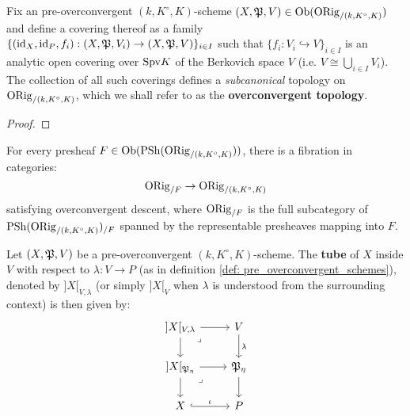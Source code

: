             \begin{proposition} \label{prop: the_overconvergent_topology}
                Fix an pre-overconvergent $(k, K^{\circ}, K)$-scheme $(X, \mathfrak{P}, V) \in \mathrm{Ob}(\mathrm{ORig}_{/(k, K^{\circ}, K)})$ and define a covering thereof as a family $\{(\mathrm{id}_X, \mathrm{id}_P, f_i): (X, \mathfrak{P}, V_i) \to (X, \mathfrak{P}, V)\}_{i \in I}$ such that $\{f_i: V_i \hookrightarrow V\}_{i \in I}$ is an analytic open covering over $\mathrm{Spv} K$ of the Berkovich space $V$ (i.e. $V \cong \bigcup_{i \in I} V_i$). The collection of all such coverings defines a \textit{subcanonical} topology on $\mathrm{ORig}_{/(k, K^{\circ}, K)}$, which we shall refer to as the \textbf{overconvergent topology}.
            \end{proposition}
                \begin{proof}
                    
                \end{proof}
            \begin{corollary}
                For every presheaf $F \in \mathrm{Ob}(\mathrm{PSh}(\mathrm{ORig}_{/(k, K^{\circ}, K)}))$, there is a fibration in categories:
                    $$\mathrm{ORig}_{/F} \to \mathrm{ORig}_{/(k, K^{\circ}, K)}$$
                satisfying overconvergent descent, where $\mathrm{ORig}_{/F}$ is the full subcategory of $\mathrm{PSh}(\mathrm{ORig}_{/(k, K^{\circ}, K)})_{/F}$ spanned by the representable presheaves mapping into $F$.
            \end{corollary}
            \begin{definition}[Tubes] \label{def: berthelot_tubes}
                Let $(X, \mathfrak{P}, V)$ be a pre-overconvergent $(k, K^{\circ}, K)$-scheme. The \textbf{tube} of $X$ inside $V$ with respect to $\lambda: V \to P$ (as in definition \ref{def: pre_overconvergent_schemes}), denoted by $]X[_{V, \lambda}$ (or simply $]X[_V$ when $\lambda$ is understood from the surrounding context) is then given by:
                    $$
                        \begin{tikzcd}
                        	{]X[_{V, \lambda}} & V \\
                        	{]X[_{\frakP_{\eta}}} & {\frakP_{\eta}} \\
                        	X & P
                        	\arrow["\iota", hook, from=3-1, to=3-2]
                        	\arrow["\lambda", from=1-2, to=2-2]
                        	\arrow[from=2-2, to=3-2]
                        	\arrow[from=1-1, to=2-1]
                        	\arrow[from=2-1, to=3-1]
                        	\arrow[from=1-1, to=1-2]
                        	\arrow[from=2-1, to=2-2]
                        	\arrow["\lrcorner"{anchor=center, pos=0.125}, draw=none, from=2-1, to=3-2]
                        	\arrow["\lrcorner"{anchor=center, pos=0.125}, draw=none, from=1-1, to=2-2]
                        \end{tikzcd}
                    $$
            \end{definition}
